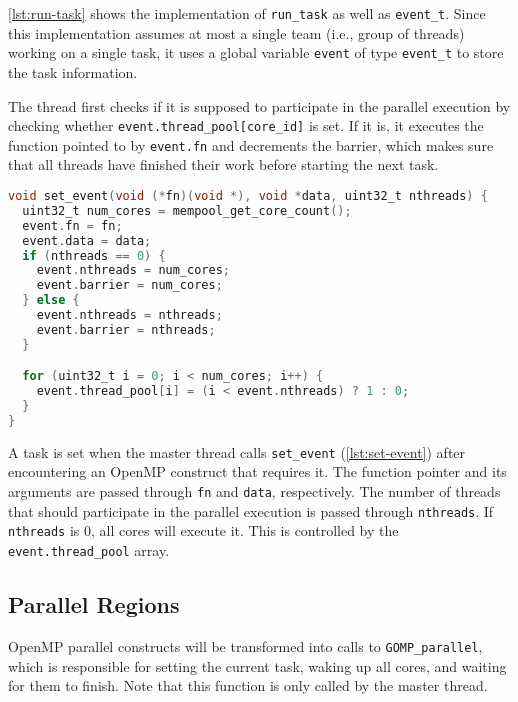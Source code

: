 \cref{lst:run-task} shows the implementation of \texttt{run\_task} as well as \texttt{event\_t}.
Since this implementation assumes at most a single team (i.e., group of threads) working on a single
task, it uses a global variable \texttt{event} of type \texttt{event\_t} to store the task
information.

The thread first checks if it is supposed to participate in the parallel execution by checking
whether \texttt{event.thread\_pool[core\_id]} is set. If it is, it executes the function pointed to
by \texttt{event.fn} and decrements the barrier, which makes sure that all threads have finished
their work before starting the next task.

\begin{lstlisting}[language=C, caption={set\_event Implementation}, label={lst:set-event}]
void set_event(void (*fn)(void *), void *data, uint32_t nthreads) {
  uint32_t num_cores = mempool_get_core_count();
  event.fn = fn;
  event.data = data;
  if (nthreads == 0) {
    event.nthreads = num_cores;
    event.barrier = num_cores;
  } else {
    event.nthreads = nthreads;
    event.barrier = nthreads;
  }

  for (uint32_t i = 0; i < num_cores; i++) {
    event.thread_pool[i] = (i < event.nthreads) ? 1 : 0;
  }
}
\end{lstlisting}

A task is set when the master thread calls \texttt{set\_event} (\cref{lst:set-event}) after
encountering an OpenMP construct that requires it. The function pointer and its arguments are passed
through \texttt{fn} and \texttt{data}, respectively. The number of threads that should participate
in the parallel execution is passed through \texttt{nthreads}. If \texttt{nthreads} is 0, all cores
will execute it. This is controlled by the \texttt{event.thread\_pool} array.

\subsection{Parallel Regions}
\label{subsec:parallel_regions}

OpenMP parallel constructs will be transformed into calls to \texttt{GOMP\_parallel}, which is
responsible for setting the current task, waking up all cores, and waiting for them to finish. Note
that this function is only called by the master thread.

